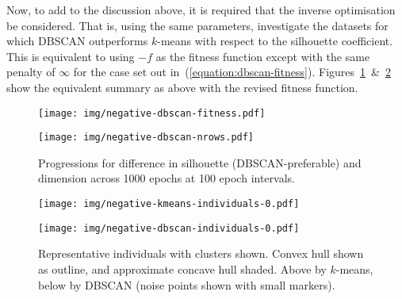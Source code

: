 
Now, to add to the discussion above, it is required that the inverse
optimisation be considered. That is, using the same parameters, investigate the
datasets for which DBSCAN outperforms \(k\)-means with respect to the silhouette
coefficient. This is equivalent to using \(-f\) as the fitness function except
with the same penalty of \(\infty\) for the case set out
in~(\ref{equation:dbscan-fitness}).
Figures~\ref{figure:negative-dbscan}~\&~\ref{figure:negative-dbscan-individuals}
show the equivalent summary as above with the revised fitness function.

\begin{figure}[htbp]
    \centering
    \begin{minipage}{\imgwidth}
        \centering
        \texttt{[image: img/negative-dbscan-fitness.pdf]}
    \end{minipage}

    \begin{minipage}{\imgwidth}
        \centering
        \texttt{[image: img/negative-dbscan-nrows.pdf]}
    \end{minipage}
    \caption{Progressions for difference in silhouette (DBSCAN-preferable) and
             dimension across 1000 epochs at 100 epoch
             intervals.}\label{figure:negative-dbscan}
\end{figure}

\begin{figure}[htbp]
    \centering
    \texttt{[image: img/negative-kmeans-individuals-0.pdf]}

    \texttt{[image: img/negative-dbscan-individuals-0.pdf]}
    \caption{Representative individuals with clusters shown. Convex hull shown
             as outline, and approximate concave hull shaded. Above by
             \(k\)-means, below by DBSCAN (noise points shown with small
             markers).}\label{figure:negative-dbscan-individuals}
\end{figure}
